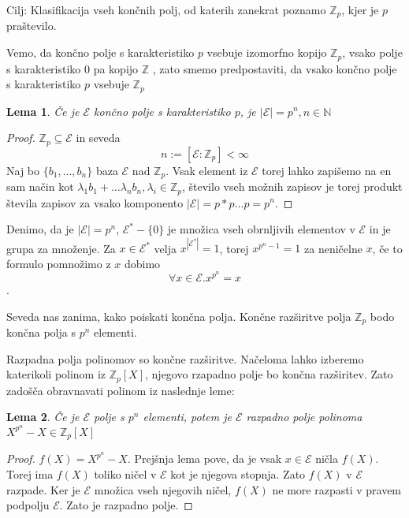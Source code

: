 \documentclass[a4paper]{article}
\newtheorem{lemma}{Lema}
\begin{document}
Cilj: Klasifikacija vseh končnih polj, od katerih zanekrat poznamo $\mathbb{Z}_p$, kjer je $p$ praštevilo.

Vemo, da končno polje s karakteristiko $p$ vsebuje izomorfno kopijo $\mathbb{Z}_p$, vsako polje s karakteristiko $0$ pa kopijo $\mathbb{Z}$%
, zato smemo predpostaviti, da vsako končno polje s karakteristiko $p$ vsebuje $\mathbb{Z}_p$

\begin{lemma}
Če je $\mathcal{E}$ končno polje s karakteristiko $p$, je $|\mathcal{E}| = p^n, n \in \mathbb{N}$
\end{lemma}

\begin{proof}
$\mathbb{Z}_p \subseteq \mathcal{E}$ in seveda $$n:=[\mathcal{E}:\mathbb{Z}_p] < \infty$$
Naj bo $\{b_1, \dots, b_n \}$ baza $\mathcal{E}$ nad $\mathbb{Z}_p$. Vsak element iz $\mathcal{E}$ torej lahko zapišemo na en sam način kot $\lambda_1 b_1 + \dots \lambda_n b_n, \lambda_i \in \mathbb{Z}_p$, število vseh možnih zapisov je torej produkt števila zapisov za vsako komponento $|\mathcal{E}| = p * p \dots p = p^n$.
\end{proof}
Denimo, da je $|\mathcal{E}| = p^n$, $\mathcal{E}^* - \{0\}$ je množica vseh obrnljivih elementov v $\mathcal{E}$ in je grupa za množenje. Za $x \in \mathcal{E}^*$ velja $x^{|\mathcal{E}^*|} = 1$, torej $x^{p^n-1} = 1$ za neničelne $x$, če to formulo pomnožimo z $x$ dobimo $$\forall x \in \mathcal{E}. x^{p^n} = x$$.

Seveda nas zanima, kako poiskati končna polja. Končne razširitve polja $\mathbb{Z}_p$ bodo končna polja s $p^n$ elementi.

Razpadna polja polinomov so končne razširitve. Načeloma lahko izberemo katerikoli polinom iz $\mathbb{Z}_p[X]$, njegovo rzapadno polje bo končna razširitev. Zato zadošča obravnavati polinom iz naslednje leme:

\begin{lemma}
Če je $\mathcal{E}$ polje s $p^n$ elementi, potem je $\mathcal{E}$  
razpadno polje polinoma $X^{p^n} - X \in \mathbb{Z}_p[X]$ 
\end{lemma}

\begin{proof}
$f(X) = X^{p^n} - X$. Prejšnja lema pove, da je vsak $x \in \mathcal{E}$ ničla $f(X)$. Torej ima $f(X)$ toliko ničel v $\mathcal{E}$ kot je njegova stopnja. Zato $f(X)$ v $\mathcal{E}$ razpade. Ker je $\mathcal{E}$ množica vseh njegovih ničel, $f(X)$ ne more razpasti v pravem podpolju $\mathcal{E}$. Zato je razpadno polje.
\end{proof}
\end{document}
